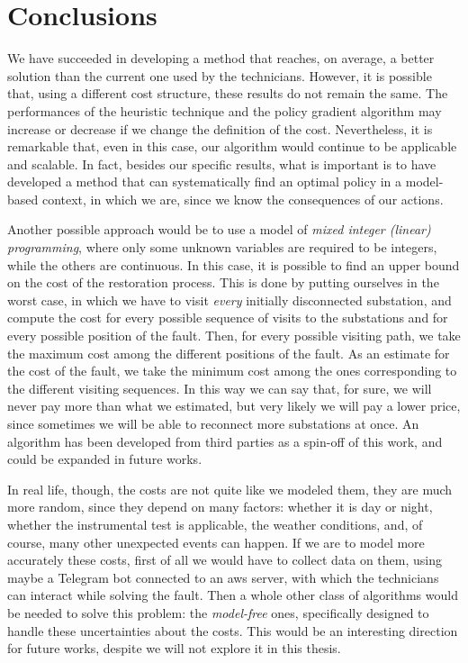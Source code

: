 \chapter{Conclusions}


We have succeeded in developing a method that reaches, on average, a better solution than the current one used by the technicians. However, it is possible that, using a different cost structure, these results do not remain the same. The performances of the heuristic technique and the policy gradient algorithm may increase or decrease if we change the definition of the cost. Nevertheless, it is remarkable that, even in this case, our algorithm would continue to be applicable and scalable. In fact, besides our specific results, what is important is to have developed a method that can systematically find an optimal policy in a model-based context, in which we are, since we know the consequences of our actions.

Another possible approach would be to use a model of \emph{mixed integer (linear) programming}, where only some unknown variables are required to be integers, while the others are continuous. In this case, it is possible to find an upper bound on the cost of the restoration process. This is done by putting ourselves in the worst case, in which we have to visit \emph{every} initially disconnected substation, and compute the cost for every possible sequence of visits to the substations and for every possible position of the fault. Then, for every possible visiting path, we take the maximum cost among the different positions of the fault. As an estimate for the cost of the fault, we take the minimum cost among the ones corresponding to the different visiting sequences. In this way we can say that, for sure, we will never pay more than what we estimated, but very likely we will pay a lower price, since sometimes we will be able to reconnect more substations at once. An algorithm has been developed from third parties as a spin-off of this work, and could be expanded in future works.

In real life, though, the costs are not quite like we modeled them, they are much more random, since they depend on many factors: whether it is day or night, whether the instrumental test is applicable, the weather conditions, and, of course, many other unexpected events can happen. If we are to model more accurately these costs, first of all we would have to collect data on them, using maybe a Telegram bot connected to an \acrshort{aws} server, with which the technicians can interact while solving the fault. Then a whole other class of algorithms would be needed to solve this problem: the \emph{model-free} ones, specifically designed to handle these uncertainties about the costs. This would be an interesting direction for future works, despite we will not explore it in this thesis.